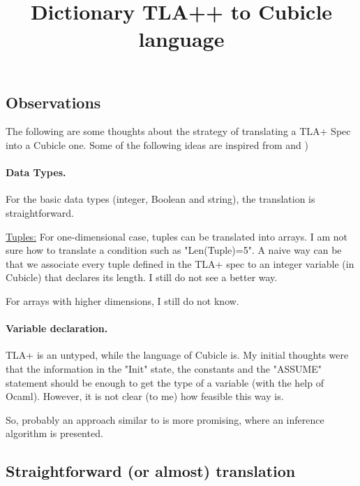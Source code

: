 \documentclass{article}
\title{Dictionary TLA++ to Cubicle language}
\begin{document}
\large


 \subsection*{Observations} 
The following are some thoughts about the strategy of translating a TLA+ Spec into a Cubicle one. 
 Some of the following ideas are inspired from \cite{10.1007/978-3-642-30729-4_3} and \cite{merz:hal-00760570})

\paragraph{Data Types.} For the basic data types (integer, Boolean and string), the translation is straightforward. 

\underline{Tuples:} For one-dimensional case, tuples  can be translated into arrays. I am not sure how to translate a condition such as "Len(Tuple)=5". A  naive way can be that we associate every tuple defined in the TLA+ spec to an integer variable (in Cubicle) that declares its length. I still do not see a better way.

For arrays with higher dimensions, I still do not know. 







\paragraph{Variable declaration.}    TLA+ is an untyped, while  the language  of Cubicle is. \color{red}My initial thoughts were that the information in the "Init"  state, the constants and the "ASSUME" statement should be enough to get the type of a variable (with the help of Ocaml). \color{black}However, it is not clear (to me) how feasible this way is. 

So, probably an approach  similar to \cite[Section 3]{merz:hal-00760570} is more promising, where an inference algorithm is presented.   



\vspace{2 cm}
 \subsection*{Straightforward (or almost) translation} 
\end{document}

